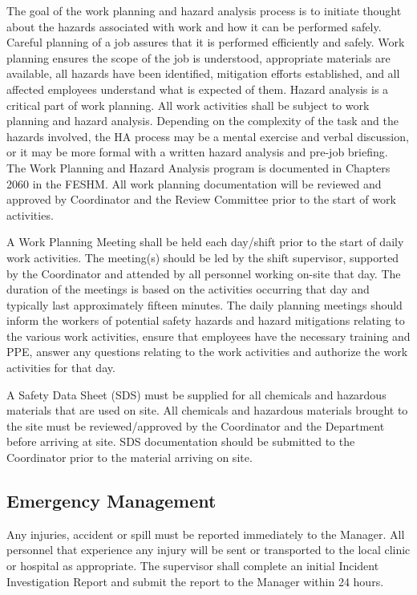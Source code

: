 The goal of the work planning and hazard analysis process is to
initiate thought about the hazards associated with work and how it can
be performed safely. Careful planning of a job assures that it is
performed efficiently and safely. Work planning ensures the scope of
the job is understood, appropriate materials are available, all
hazards have been identified, mitigation efforts established, and all
affected employees understand what is expected of them. Hazard
analysis is a critical part of work planning. All work activities
shall be subject to work planning and hazard analysis. Depending on
the complexity of the task and the hazards involved, the HA process
may be a mental exercise and verbal discussion, or it may be more
formal with a written hazard analysis and pre-job briefing. The Work
Planning and Hazard Analysis program is documented in Chapters 2060 in
the FESHM. All work planning documentation will be reviewed and
approved by   Coordinator and the 
 Review Committee prior to the start of work activities.

A Work Planning Meeting shall be held each day/shift prior to the
start of daily work activities. The meeting(s) should be led by the
shift supervisor, supported by the   Coordinator and
attended by all personnel working on-site that day. The duration of
the meetings is based on the activities occurring that day and
typically last approximately fifteen minutes. The daily planning
meetings should inform the workers of potential safety hazards and
hazard mitigations relating to the various work activities, ensure
that employees have the necessary  training and PPE, answer any
questions relating to the work activities and authorize the work
activities for that day.

A Safety Data Sheet (SDS) must be supplied for all chemicals and
hazardous materials that are used on site. All chemicals and hazardous
materials brought to the  site must be reviewed/approved by the
  Coordinator and the  
Department before arriving at site.  SDS documentation should be
submitted to the   Coordinator prior to the
material arriving on site.

\subsection{Emergency Management}

Any injuries, accident or spill must be reported immediately to the
  Manager. All personnel that
experience any injury will be sent or transported to the local clinic
or hospital as appropriate.  The supervisor shall complete an initial
Incident Investigation Report and submit the report to the
  Manager within 24 hours.

